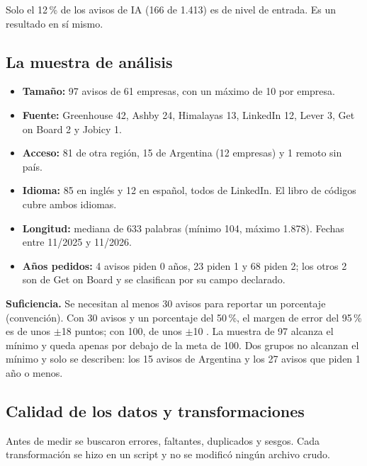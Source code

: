 \documentclass[11pt,a4paper]{article}
\begin{document}
Solo el 12\,\% de los avisos de IA (166 de 1.413) es de nivel de entrada. Es un resultado en sí mismo.

\subsection{La muestra de análisis}
\begin{itemize}
\item \textbf{Tamaño:} 97 avisos de 61 empresas, con un máximo de 10 por empresa.
\item \textbf{Fuente:} Greenhouse 42, Ashby 24, Himalayas 13, LinkedIn 12, Lever 3, Get on Board 2 y Jobicy 1.
\item \textbf{Acceso:} 81 de otra región, 15 de Argentina (12 empresas) y 1 remoto sin país.
\item \textbf{Idioma:} 85 en inglés y 12 en español, todos de LinkedIn. El libro de códigos cubre ambos idiomas.
\item \textbf{Longitud:} mediana de 633 palabras (mínimo 104, máximo 1.878). Fechas entre 11/2025 y 11/2026.
\item \textbf{Años pedidos:} 4 avisos piden 0 años, 23 piden 1 y 68 piden 2; los otros 2 son de Get on Board y se clasifican por su campo declarado.
\end{itemize}

\textbf{Suficiencia.} Se necesitan al menos 30 avisos para reportar un porcentaje (convención). Con 30 avisos y un porcentaje del 50\,\%, el margen de error del 95\,\% es de unos $\pm$18 puntos; con 100, de unos $\pm$10 \cite{brown2001}. La muestra de 97 alcanza el mínimo y queda apenas por debajo de la meta de 100. Dos grupos no alcanzan el mínimo y solo se describen: los 15 avisos de Argentina y los 27 avisos que piden 1 año o menos.

\subsection{Calidad de los datos y transformaciones}
Antes de medir se buscaron errores, faltantes, duplicados y sesgos. Cada transformación se hizo en un script y no se modificó ningún archivo crudo.
\end{document}
